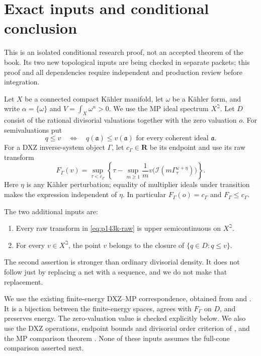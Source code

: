 \section{Exact inputs and conditional conclusion}

This is an isolated conditional research proof, not an accepted theorem of
the book. Its two new topological inputs are being checked in separate
packets; this proof and all dependencies require independent and production
review before integration.

Let \(X\) be a connected compact K\"ahler manifold, let \(\omega\) be a
K\"ahler form, and write \(\alpha=\{\omega\}\) and
\(V=\int_X\omega^n>0\). We use the MP ideal spectrum \(X^\beth\).
Let \(D\) consist of the rational divisorial valuations together with the
zero valuation \(o\). For semivaluations put
\[
 q\leq v\quad\Longleftrightarrow\quad
 q(\mathfrak a)\leq v(\mathfrak a)
 \text{ for every coherent ideal }\mathfrak a.
\]
For a DXZ inverse-system object \(\Gamma\), let \(c_\Gamma\in\mathbf R\)
be its endpoint and use its raw transform
\begin{equation}\label{eq:p143k-raw}
 F_\Gamma(v)=\sup_{\tau<c_\Gamma}
 \left\{\tau-\sup_{m\geq1}\frac1m
 v\bigl(\mathcal I(m\Gamma^{\omega+\eta}_\tau)\bigr)\right\}.
\end{equation}
Here \(\eta\) is any K\"ahler perturbation; equality of multiplier ideals
under transition makes the expression independent of \(\eta\).
In particular \(F_\Gamma(o)=c_\Gamma\) and \(F_\Gamma\leq c_\Gamma\).

The two additional inputs are:
\begin{enumerate}
\item\label{hyp:p143k-usc} Every raw transform in \eqref{eq:p143k-raw}
is upper semicontinuous on \(X^\beth\).
\item\label{hyp:p143k-density} For every \(v\in X^\beth\), the point
\(v\) belongs to the closure of \(\{q\in D:q\leq v\}\).
\end{enumerate}
The second assertion is stronger than ordinary divisorial density. It
does not follow just by replacing a net with a sequence, and we do not
make that replacement.

We use the existing finite-energy DXZ--MP correspondence, obtained from
\cite[Theorem~3.17]{DXZ23} and
\cite[Theorems~5.1.4, 5.1.7 and Section~5.2]{MP24}. It is a bijection
between the finite-energy spaces, agrees with \(F_\Gamma\) on \(D\),
and preserves energy. The zero-valuation value is checked explicitly
below. We also use the DXZ operations, endpoint bounds and divisorial
order criterion of \cite[Section~4.1--4.4]{Xia23}, and the MP comparison
theorem \cite[Theorem~4.3.8]{MP24}. None of these inputs assumes the
full-cone comparison asserted next.

